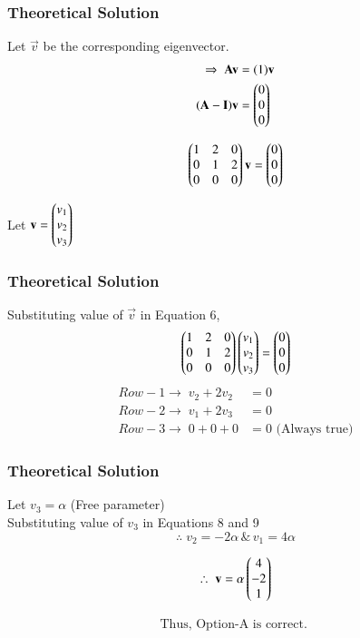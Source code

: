 \documentclass{beamer}
\begin{document}
\begin{frame}[fragile]
    \frametitle{Theoretical Solution}
Let $\vec{v}$ be the corresponding eigenvector.
\begin{align}
    \Rightarrow \; \mathbf{A}\mathbf{v} &= (1)\mathbf{v} \\ 
    (\mathbf{A} - \mathbf{I})\mathbf{v} &= \begin{pmatrix}0 \\ 0 \\ 0\end{pmatrix}
\end{align}

\begin{equation}
\begin{pmatrix}1 & 2 & 0 \\ 0 & 1 & 2 \\ 0 & 0 & 0\end{pmatrix}\mathbf{v} = \begin{pmatrix}0 \\ 0 \\ 0\end{pmatrix}    
\end{equation}

Let $\mathbf{v} = \begin{pmatrix}v_1 \\ v_2 \\ v_3\end{pmatrix}$\\
\end{frame}

\begin{frame}[fragile]
\frametitle{Theoretical Solution}
    Substituting value of $\vec{v}$ in Equation 6,
\begin{equation}
   \begin{pmatrix}1 & 2 & 0 \\ 0 & 1 & 2 \\ 0 & 0 & 0\end{pmatrix}\begin{pmatrix}v_1 \\ v_2 \\ v_3\end{pmatrix} = \begin{pmatrix}0 \\ 0 \\ 0\end{pmatrix} 
\end{equation}
\begin{align}
    Row-1 \rightarrow \; v_2 + 2v_2 &= 0\\
    Row-2 \rightarrow \; v_1 + 2v_3 &= 0\\
    Row-3 \rightarrow \; 0 + 0 + 0 &= 0 \text{ (Always true)}
\end{align}
\end{frame}

\begin{frame}[fragile]
    \frametitle{Theoretical Solution}
Let $v_3 = \alpha$ (Free parameter)\\
Substituting value of $v_3$ in Equations 8 and 9
\begin{equation}
\therefore \; v_2 = -2\alpha \, \&  \, v_1 = 4\alpha  
\end{equation}

\begin{equation}
    \therefore \; \mathbf{v} = \alpha \begin{pmatrix}4 \\ -2 \\ 1\end{pmatrix} 
\end{equation}

\begin{align*}
    \boxed{\text{Thus, Option-A is correct. }}
\end{align*}
\end{frame}
\end{document}
